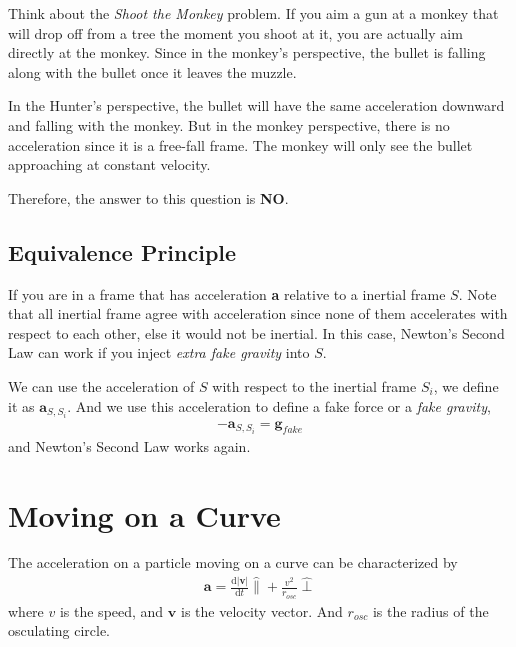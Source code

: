 \documentclass[12pt]{article}
\newcommand{\dydx}[2]{\frac{\text{d} #1}{\text{d} #2}}
\newcommand{\abso}[1]{\left|#1 \right|}
\begin{document}
Think about the \textit{Shoot the Monkey} problem. If you aim a gun at a monkey that will drop off from a tree the moment you shoot at it, you are actually aim directly at the monkey. Since in the monkey's perspective, the bullet is falling along with the bullet once it leaves the muzzle. 

In the Hunter's perspective, the bullet will have the same acceleration downward and falling with the monkey. But in the monkey perspective, there is no acceleration since it is a free-fall frame. The monkey will only see the bullet approaching at constant velocity. 

Therefore, the answer to this question is \textbf{NO}.

\subsection{Equivalence Principle}
If you are in a frame that has acceleration \textbf{a} relative to a inertial frame $S$. Note that all inertial frame agree with acceleration since none of them accelerates with respect to each other, else it would not be inertial. In this case, Newton's Second Law can work if you inject \textit{extra fake gravity} into $S$.

We can use the acceleration of $S$ with respect to the inertial frame $S_i$, we define it as $\mathbf{a}_{S,S_i}$. And we use this acceleration to define a fake force or a \textit{fake gravity}, 
\begin{align}
-\mathbf{a}_{S,S_i} = \mathbf{g}_{fake}
\end{align}
and Newton's Second Law works again. 

\section{Moving on a Curve}
The acceleration on a particle moving on a curve can be characterized by
\begin{align}
\mathbf{a} = \dydx{\abso{\mathbf{v}}}{t}\hat{\parallel} + \frac{v^2}{r_{osc}}\hat{\perp}
\end{align}
where $v$ is the speed, and $\mathbf{v}$ is the velocity vector. And $r_{osc}$ is the radius of the osculating circle.
\end{document}
